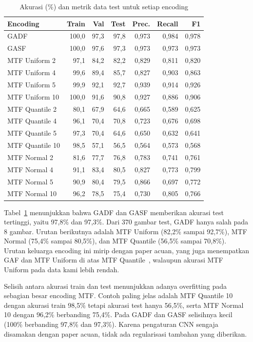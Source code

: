 \begin{table}[t]
\centering
\caption{Akurasi (\%) dan metrik data test untuk setiap encoding}
\label{tab:akurasi}
\footnotesize
\setlength{\tabcolsep}{3.5pt}
\begin{tabular}{lrrrrrr}
\toprule
Encoding & Train & Val & Test & Prec. & Recall & F1 \\
\midrule
GADF & 100,0 & 97,3 & 97,8 & 0,973 & 0,984 & 0,978 \\
GASF & 100,0 & 97,6 & 97,3 & 0,973 & 0,973 & 0,973 \\
MTF Uniform 2 & 97,1 & 84,2 & 82,2 & 0,829 & 0,811 & 0,820 \\
MTF Uniform 4 & 99,6 & 89,4 & 85,7 & 0,827 & 0,903 & 0,863 \\
MTF Uniform 5 & 99,9 & 92,1 & 92,7 & 0,939 & 0,914 & 0,926 \\
MTF Uniform 10 & 100,0 & 91,6 & 90,8 & 0,927 & 0,886 & 0,906 \\
MTF Quantile 2 & 80,1 & 67,9 & 64,6 & 0,665 & 0,589 & 0,625 \\
MTF Quantile 4 & 96,1 & 70,4 & 70,8 & 0,723 & 0,676 & 0,698 \\
MTF Quantile 5 & 97,3 & 70,4 & 64,6 & 0,650 & 0,632 & 0,641 \\
MTF Quantile 10 & 98,5 & 57,1 & 56,5 & 0,564 & 0,573 & 0,568 \\
MTF Normal 2 & 81,6 & 77,7 & 76,8 & 0,783 & 0,741 & 0,761 \\
MTF Normal 4 & 91,1 & 83,4 & 80,5 & 0,827 & 0,773 & 0,799 \\
MTF Normal 5 & 90,9 & 80,4 & 79,5 & 0,866 & 0,697 & 0,772 \\
MTF Normal 10 & 96,2 & 78,5 & 75,4 & 0,730 & 0,805 & 0,766 \\
\bottomrule
\end{tabular}
\end{table}

Tabel~\ref{tab:akurasi} menunjukkan bahwa GADF dan GASF memberikan akurasi test tertinggi, yaitu 97,8\% dan 97,3\%. Dari 370 gambar test, GADF hanya salah pada 8 gambar. Urutan berikutnya adalah MTF Uniform (82,2\% sampai 92,7\%), MTF Normal (75,4\% sampai 80,5\%), dan MTF Quantile (56,5\% sampai 70,8\%). Urutan keluarga encoding ini mirip dengan paper acuan, yang juga menempatkan GAF dan MTF Uniform di atas MTF Quantile~\cite{rahadian2023}, walaupun akurasi MTF Uniform pada data kami lebih rendah.

Selisih antara akurasi train dan test menunjukkan adanya overfitting pada sebagian besar encoding MTF. Contoh paling jelas adalah MTF Quantile 10 dengan akurasi train 98,5\% tetapi akurasi test hanya 56,5\%, serta MTF Normal 10 dengan 96,2\% berbanding 75,4\%. Pada GADF dan GASF selisihnya kecil (100\% berbanding 97,8\% dan 97,3\%). Karena pengaturan CNN sengaja disamakan dengan paper acuan, tidak ada regularisasi tambahan yang diberikan.

